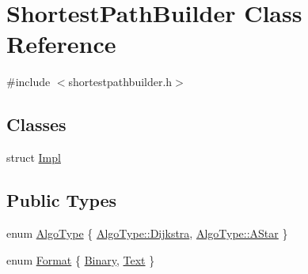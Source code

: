 \hypertarget{class_shortest_path_builder}{}\section{Shortest\+Path\+Builder Class Reference}
\label{class_shortest_path_builder}


{\ttfamily \#include $<$shortestpathbuilder.\+h$>$}

\subsection*{Classes}
\begin{DoxyCompactItemize}
\item 
struct \mbox{\hyperlink{struct_shortest_path_builder_1_1_impl}{Impl}}
\end{DoxyCompactItemize}
\subsection*{Public Types}
\begin{DoxyCompactItemize}
\item 
enum \mbox{\hyperlink{class_shortest_path_builder_a1ba5dda0ad139bf12f34e1eb552bcb13}{Algo\+Type}} \{ \mbox{\hyperlink{class_shortest_path_builder_a1ba5dda0ad139bf12f34e1eb552bcb13a052d7289884a0d0dae24aa88a7e62e83}{Algo\+Type\+::\+Dijkstra}}, 
\mbox{\hyperlink{class_shortest_path_builder_a1ba5dda0ad139bf12f34e1eb552bcb13a5dd57ad2903b807a288f1519c98dfc29}{Algo\+Type\+::\+A\+Star}}
 \}
\item 
enum \mbox{\hyperlink{class_shortest_path_builder_afd1e54ec63b4266aed503c6fb3bb7a73}{Format}} \{ \mbox{\hyperlink{class_shortest_path_builder_afd1e54ec63b4266aed503c6fb3bb7a73adfe54cf287abea5248d8b43f1cde7860}{Binary}}, 
\mbox{\hyperlink{class_shortest_path_builder_afd1e54ec63b4266aed503c6fb3bb7a73a7eb68795d2fcaeb3c6e39b87d9dfac3f}{Text}}
 \}
\end{DoxyCompactItemize}
